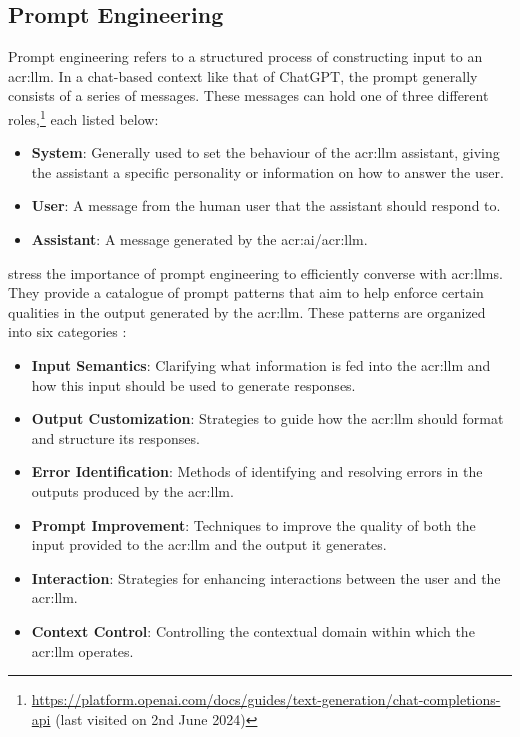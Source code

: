 \subsection{Prompt Engineering}
\label{subsec:prompt-engineering}

Prompt engineering refers to a structured process of constructing input to an \acrshort{acr:llm}. In a chat-based context like that of ChatGPT, the prompt generally consists of a series of messages. These messages can hold one of three different roles,\footnote{\url{https://platform.openai.com/docs/guides/text-generation/chat-completions-api} (last visited on 2nd June 2024)} each listed below:

\begin{itemize}
    \item \textbf{System}: Generally used to set the behaviour of the \acrshort{acr:llm} assistant, giving the assistant a specific personality or information on how to answer the user.
    \item \textbf{User}: A message from the human user that the assistant should respond to.
    \item \textbf{Assistant}: A message generated by the \acrshort{acr:ai}/\acrshort{acr:llm}.
\end{itemize}

\cite{whitePromptPatternCatalog2023} stress the importance of prompt engineering to efficiently converse with \glspl{acr:llm}. They provide a catalogue of prompt patterns that aim to help enforce certain qualities in the output generated by the \gls{acr:llm}. These patterns are organized into six categories \citep[4]{whitePromptPatternCatalog2023}:

\begin{itemize}
    \item \textbf{Input Semantics}: Clarifying what information is fed into the \acrshort{acr:llm} and how this input should be used to generate responses.
    \item \textbf{Output Customization}: Strategies to guide how the \acrshort{acr:llm} should format and structure its responses.
    \item \textbf{Error Identification}: Methods of identifying and resolving errors in the outputs produced by the \acrshort{acr:llm}.
    \item \textbf{Prompt Improvement}: Techniques to improve the quality of both the input provided to the \acrshort{acr:llm} and the output it generates.
    \item \textbf{Interaction}: Strategies for enhancing interactions between the user and the \acrshort{acr:llm}.
    \item \textbf{Context Control}: Controlling the contextual domain within which the \acrshort{acr:llm} operates.
\end{itemize}

